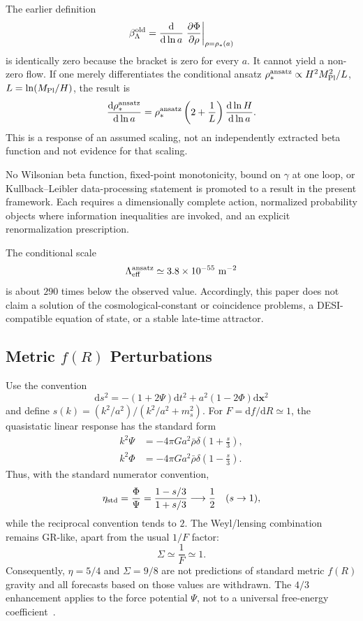 \documentclass[12pt,a4paper]{article}
\theoremstyle{definition}
\theoremstyle{plain}
\theoremstyle{remark}
\newcommand{\Leff}{\Lambda_{\mathrm{eff}}}
\newcommand{\dd}{\mathrm{d}}
\begin{document}
The earlier definition
\[
 \beta_\Lambda^{\rm old}
 =\frac{\dd}{\dd\ln a}
 \left.\frac{\partial\Phi}{\partial\rho}\right|_{\rho=\rho_\ast(a)}
\]
is identically zero because the bracket is zero for every \(a\).  It cannot
yield a non-zero flow.  If one merely differentiates the conditional ansatz
\(\rho_\ast^{\rm ansatz}\propto H^2M_{\rm Pl}^2/L\),
\(L=\ln(M_{\rm Pl}/H)\), the result is
\begin{equation}\label{eq:beta-response}
 \frac{\dd\rho_\ast^{\rm ansatz}}{\dd\ln a}
 =\rho_\ast^{\rm ansatz}
 \left(2+\frac1L\right)\frac{\dd\ln H}{\dd\ln a}.
\end{equation}
This is a response of an assumed scaling, not an independently extracted beta
function and not evidence for that scaling.

No Wilsonian beta function, fixed-point monotonicity, bound on \(\gamma\) at one loop,
or Kullback--Leibler data-processing statement is promoted to a result in the
present framework. Each requires a dimensionally complete action, normalized
probability objects where information inequalities are invoked, and an explicit
renormalization prescription.

The conditional scale
\[
 \Leff^{\rm ansatz}\simeq3.8\times10^{-55}\ {\rm m}^{-2}
\]
is about \(290\) times below the observed value.  Accordingly, this paper does
not claim a solution of the cosmological-constant or coincidence problems,
a DESI-compatible equation of state, or a stable late-time attractor.

\subsection{\texorpdfstring{Metric \(f(R)\) Perturbations}{Metric f(R) Perturbations}}\label{sec:predictions-falsifiable}

Use the convention
\[
 \dd s^2=-(1+2\Psi)\dd t^2+a^2(1-2\Phi)\dd\mathbf x^2
\]
and define
\(s(k)= (k^2/a^2)/(k^2/a^2+m_s^2)\).
For \(F=\dd f/\dd R\simeq1\), the quasistatic linear response has the standard
form
\begin{align}
 k^2\Psi&=-4\pi Ga^2\bar\rho\delta
 \left(1+\frac{s}{3}\right),\label{eq:Poisson-Psi}\\
 k^2\Phi&=-4\pi Ga^2\bar\rho\delta
 \left(1-\frac{s}{3}\right).\label{eq:Poisson-Phi}
\end{align}
Thus, with the standard numerator convention,
\begin{equation}\label{eq:grav-slip}
 \eta_{\rm std}=\frac{\Phi}{\Psi}
 =\frac{1-s/3}{1+s/3}
 \longrightarrow\frac12
 \quad (s\to1),
\end{equation}
while the reciprocal convention tends to \(2\).  The Weyl/lensing
combination remains GR-like, apart from the usual \(1/F\) factor:
\begin{equation}\label{eq:Sigma}
 \Sigma\simeq\frac1F\simeq1 .
\end{equation}
Consequently, \(\eta=5/4\) and \(\Sigma=9/8\) are not predictions of standard
metric \(f(R)\) gravity and all forecasts based on those values are withdrawn.
The \(4/3\) enhancement applies to the force potential \(\Psi\), not to a
universal free-energy coefficient~\cite{HuSawicki2007,SotiriouFaraoni2010}.
\end{document}

